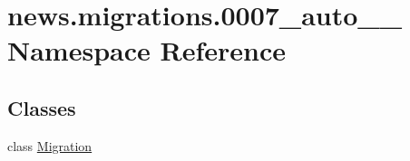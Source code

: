 \hypertarget{namespacenews_1_1migrations_1_10007__auto__20181013__0120}{}\section{news.\+migrations.0007\+\_\+auto\+\_\+\_ Namespace Reference}
\label{namespacenews_1_1migrations_1_10007__auto__20181013__0120}
\subsection*{Classes}
\begin{DoxyCompactItemize}
\item 
class \mbox{\hyperlink{classnews_1_1migrations_1_10007__auto__20181013__0120_1_1_migration}{Migration}}
\end{DoxyCompactItemize}
